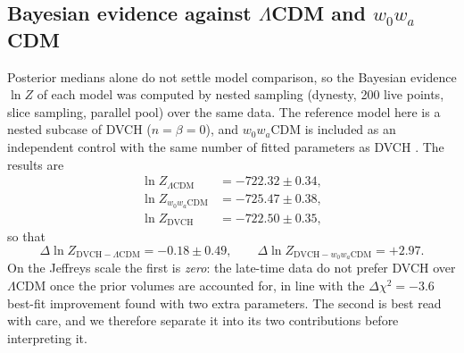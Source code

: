 \documentclass[pdflatex,sn-mathphys-num]{sn-jnl}%
\begin{document}
\subsection{Bayesian evidence against $\Lambda$CDM and $w_0w_a$CDM}
\label{subsec:bayes_latetime}

Posterior medians alone do not settle model comparison, so the Bayesian
evidence $\ln Z$ of each model was computed by nested sampling (dynesty,
200 live points, slice sampling, parallel pool) over the same data. The
reference model here is a nested
subcase of DVCH ($n=\beta=0$), and $w_0w_a$CDM is included as an independent
control with the same number of fitted parameters as DVCH
\cite{Chevallier:2000qy,Linder:2002et}. The results are
\begin{equation}
\begin{aligned}
\ln Z_{\Lambda\mathrm{CDM}} &= -722.32\pm0.34,\\
\ln Z_{w_0w_a\mathrm{CDM}} &= -725.47\pm0.38,\\
\ln Z_{\mathrm{DVCH}} &= -722.50\pm0.35,
\end{aligned}
\label{eq:logZ_latetime}
\end{equation}
so that
\begin{equation}
\Delta\ln Z_{\mathrm{DVCH}-\Lambda\mathrm{CDM}} = -0.18\pm0.49,
\qquad
\Delta\ln Z_{\mathrm{DVCH}-w_0w_a\mathrm{CDM}} = +2.97 .
\label{eq:deltalogZ}
\end{equation}
On the Jeffreys scale \cite{Jeffreys:1961} the first is \emph{zero}: the
late-time data do not prefer DVCH over $\Lambda$CDM once the prior volumes
are accounted for, in line with the $\Delta\chi^2=-3.6$ best-fit
improvement found with two extra parameters. The second is best read with
care, and we therefore separate it into its two contributions before
interpreting it.
\end{document}
